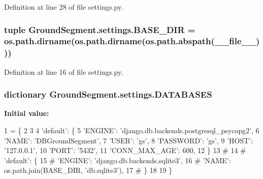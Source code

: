 Definition at line 28 of file settings.\+py.

\hypertarget{namespace_ground_segment_1_1settings_a96d9de6863371f2594631eee01ef0600}{}
\subsubsection[{B\+A\+S\+E\+\_\+\+D\+I\+R}]{\setlength{\rightskip}{0pt plus 5cm}tuple Ground\+Segment.\+settings.\+B\+A\+S\+E\+\_\+\+D\+I\+R = os.\+path.\+dirname(os.\+path.\+dirname(os.\+path.\+abspath(\+\_\+\+\_\+file\+\_\+\+\_\+)))}\label{namespace_ground_segment_1_1settings_a96d9de6863371f2594631eee01ef0600}


Definition at line 16 of file settings.\+py.

\hypertarget{namespace_ground_segment_1_1settings_a73f9e9739e7dccd65add635931f4f98e}{}
\subsubsection[{D\+A\+T\+A\+B\+A\+S\+E\+S}]{\setlength{\rightskip}{0pt plus 5cm}dictionary Ground\+Segment.\+settings.\+D\+A\+T\+A\+B\+A\+S\+E\+S}\label{namespace_ground_segment_1_1settings_a73f9e9739e7dccd65add635931f4f98e}
{\bfseries Initial value\+:}
\begin{DoxyCode}
1 = \{
2    
3 
4     \textcolor{stringliteral}{'default'}: \{
5                 \textcolor{stringliteral}{'ENGINE'}: \textcolor{stringliteral}{'django.db.backends.postgresql\_psycopg2'},
6                 \textcolor{stringliteral}{'NAME'}: \textcolor{stringliteral}{'DBGroundSegment'},
7                 \textcolor{stringliteral}{'USER'}: \textcolor{stringliteral}{'gs'},
8                 \textcolor{stringliteral}{'PASSWORD'}: \textcolor{stringliteral}{'gs'},
9                 \textcolor{stringliteral}{'HOST'}: \textcolor{stringliteral}{'127.0.0.1'},
10                 \textcolor{stringliteral}{'PORT'}: \textcolor{stringliteral}{'5432'},
11                 \textcolor{stringliteral}{'CONN\_MAX\_AGE'}: 600,
12          \}
13 \textcolor{comment}{#     }
14 \textcolor{comment}{#     'default': \{}
15 \textcolor{comment}{#          'ENGINE': 'django.db.backends.sqlite3',}
16 \textcolor{comment}{#          'NAME': os.path.join(BASE\_DIR, 'db.sqlite3'),}
17 \textcolor{comment}{#      \}}
18      
19 \}
\end{DoxyCode}


